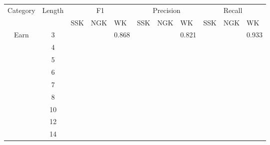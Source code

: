 \begin{table}[]
\centering
\caption{My caption}
\label{my-label}
\begin{longtable}{c|c|l|l|l|l|l|l|l|l|l|}
\hline
\multicolumn{1}{|c|}{Category}              & Length                  & \multicolumn{3}{c|}{F1} & \multicolumn{3}{c|}{Precision} & \multicolumn{3}{c|}{Recall} \\ \cline{3-11} 
\multicolumn{1}{|l|}{}                      & \multicolumn{1}{l|}{}   & SSK   & NGK   & WK      & SSK      & NGK     & WK        & SSK     & NGK    & WK       \\ \hline
\multicolumn{1}{|c|}{\multirow{9}{*}{Earn}} & 3                       &       &       & 0.868   &          &         & 0.821     &         &        & 0.933    \\ \cline{2-11} 
\multicolumn{1}{|c|}{}                      & 4                       &       &       &         &          &         &           &         &        &          \\ \cline{2-11} 
\multicolumn{1}{|c|}{}                      & 5                       &       &       &         &          &         &           &         &        &          \\ \cline{2-11} 
\multicolumn{1}{|c|}{}                      & 6                       &       &       &         &          &         &           &         &        &          \\ \cline{2-11} 
\multicolumn{1}{|c|}{}                      & 7                       &       &       &         &          &         &           &         &        &          \\ \cline{2-11} 
\multicolumn{1}{|c|}{}                      & 8                       &       &       &         &          &         &           &         &        &          \\ \cline{2-11} 
\multicolumn{1}{|c|}{}                      & 10                      &       &       &         &          &         &           &         &        &          \\ \cline{2-11} 
\multicolumn{1}{|c|}{}                      & 12                      &       &       &         &          &         &           &         &        &          \\ \cline{2-11} 
\multicolumn{1}{|c|}{}                      & 14                      &       &       &         &          &         &           &         &        &          \\ \hline

\end{longtable}
\end{table}
